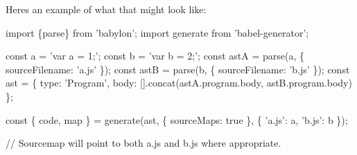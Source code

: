 Here\textquotesingle{}s an example of what that might look like\+:


\begin{DoxyCode}
import \{parse\} from 'babylon';
import generate from 'babel-generator';

const a = 'var a = 1;';
const b = 'var b = 2;';
const astA = parse(a, \{ sourceFilename: 'a.js' \});
const astB = parse(b, \{ sourceFilename: 'b.js' \});
const ast = \{
  type: 'Program',
  body: [].concat(astA.program.body, astB.program.body)
\};

const \{ code, map \} = generate(ast, \{ sourceMaps: true \}, \{
  'a.js': a,
  'b.js': b
\});

// Sourcemap will point to both a.js and b.js where appropriate.
\end{DoxyCode}
 